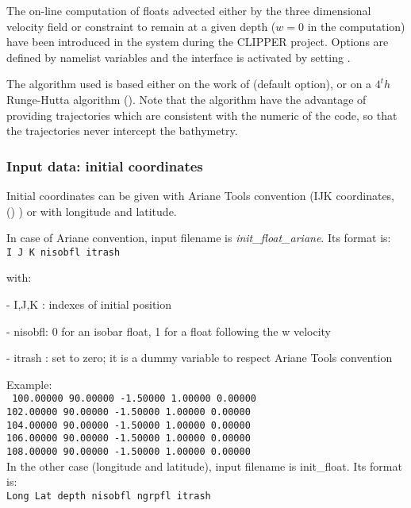 \documentclass[../main/NEMO_manual]{subfiles}
\begin{document}
The on-line computation of floats advected either by the three dimensional velocity field or constraint to
remain at a given depth ($w = 0$ in the computation) have been introduced in the system during the CLIPPER project.
Options are defined by  namelist variables and the interface is activated by setting .

The algorithm used is based either on the work of \cite{blanke.raynaud_JPO97} (default option),
or on a $4^th$ Runge-Hutta algorithm ().
Note that the \cite{blanke.raynaud_JPO97} algorithm have the advantage of providing trajectories which
are consistent with the numeric of the code, so that the trajectories never intercept the bathymetry.

\subsubsection{Input data: initial coordinates}

Initial coordinates can be given with Ariane Tools convention
(IJK coordinates, () ) or with longitude and latitude.

In case of Ariane convention, input filename is \textit{init\_float\_ariane}.
Its format is: \\
{ \texttt{I J K nisobfl itrash}}

\noindent with:

 - I,J,K  : indexes of initial position

 - nisobfl: 0 for an isobar float, 1 for a float following the w velocity

 - itrash : set to zero; it is a dummy variable to respect Ariane Tools convention

\noindent Example: \\
\noindent
{
  \texttt{
    100.00000  90.00000  -1.50000 1.00000   0.00000   \\
    102.00000  90.00000  -1.50000 1.00000   0.00000   \\
    104.00000  90.00000  -1.50000 1.00000   0.00000   \\
    106.00000  90.00000  -1.50000 1.00000   0.00000   \\
    108.00000  90.00000  -1.50000 1.00000   0.00000}
} \\

In the other case (longitude and latitude), input filename is init\_float.
Its format is: \\
{ \texttt{Long Lat depth nisobfl ngrpfl itrash}}
\end{document}
